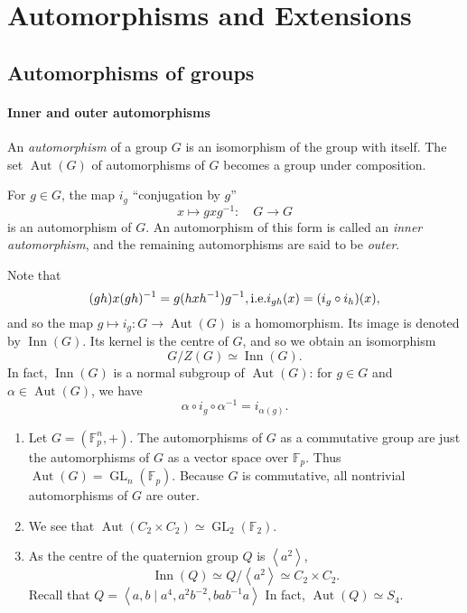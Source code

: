 \section{Automorphisms and Extensions}

\subsection{Automorphisms of groups}

\paragraph{Inner and outer automorphisms}

\begin{definition}
  An \emph{automorphism} of a group \( G \) is an isomorphism of the group with itself.
  The set \( \operatorname{Aut}(G) \) of automorphisms of \( G \) becomes a group under composition.
\end{definition}

\begin{definition}
  For \( g \in G \), the map \( i_g \) ``conjugation by \( g \)''
  \[
    x \mapsto g x g^{-1}:\quad G \to G
  \]
  is an automorphism of \( G \).
  An automorphism of this form is called an \emph{inner automorphism}, and the remaining automorphisms are said to be \emph{outer}.
\end{definition}

Note that
\[
  (gh) x (gh)^{-1} = g(h x h^{-1})g^{-1}, \textmd{i.e.} i_{gh}(x) = (i_g \circ i_h)(x),
\]
and so the map \( g \mapsto i_g: G \to \operatorname{Aut}(G) \) is a homomorphism.
Its image is denoted by \( \operatorname{Inn}(G) \).
Its kernel is the centre of \( G \), and so we obtain an isomorphism
\[
  G / Z(G) \simeq \operatorname{Inn}(G).
\]
In fact, \( \operatorname{Inn}(G) \) is a normal subgroup of \( \operatorname{Aut}(G) \): for \( g \in G \) and \( \alpha \in \operatorname{Aut}(G) \), we have
\[
  \alpha \circ i_g \circ \alpha^{-1} = i_{\alpha(g)}.
\]

\begin{example}
  \begin{enumerate}
    \item Let \( G = (\mathbb{F}^n_p, +) \).
      The automorphisms of \( G \) as a commutative group are just the automorphisms of \( G \) as a vector space over \( \mathbb{F}_p \).
      Thus \( \operatorname{Aut}(G) = \operatorname{GL}_n(\mathbb{F}_p) \).
      Because \( G \) is commutative, all nontrivial automorphisms of \( G \) are outer.
    \item We see that \( \operatorname{Aut}(C_2 \times C_2) \simeq \operatorname{GL}_2(\mathbb{F}_2) \).
    \item As the centre of the quaternion group \( Q \) is \( \left\langle a^2 \right\rangle \),
      \[
        \operatorname{Inn}(Q) \simeq Q / \left\langle a^2 \right\rangle \simeq C_2 \times C_2.
      \]
        Recall that \( Q = \left\langle a, b \mid a^4, a^2b^{-2}, bab^{-1}a  \right\rangle \)
      In fact, \( \operatorname{Aut}(Q) \simeq S_4 \).
  \end{enumerate}
\end{example}

